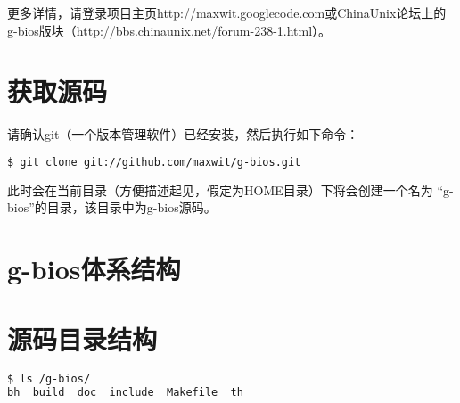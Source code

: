 更多详情，请登录项目主页http://maxwit.googlecode.com或ChinaUnix论坛上的g-bios版块（http://bbs.chinaunix.net/forum-238-1.html）。

\section{获取源码}
请确认git（一个版本管理软件）已经安装，然后执行如下命令：
\begin{lstlisting}[language=bash,numbers=none]
$ git clone git://github.com/maxwit/g-bios.git
\end{lstlisting}
此时会在当前目录（方便描述起见，假定为HOME目录）下将会创建一个名为 ``g-bios''的目录，该目录中为g-bios源码。

\section{g-bios体系结构}

\section{源码目录结构}
\begin{lstlisting}[language=bash, numbers=none]
$ ls /g-bios/
bh  build  doc  include  Makefile  th
\end{lstlisting}

